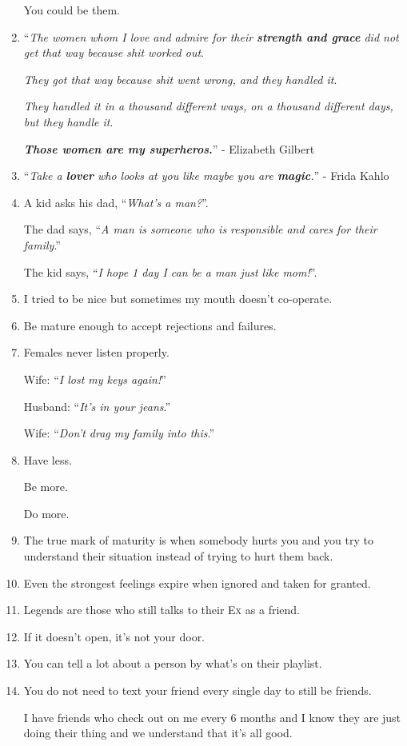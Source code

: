 \documentclass{article}
\begin{document}
\begin{enumerate}
	You could be them.
	\item ``\textit{The women whom I love and admire for their \textbf{strength and grace} did not get that way because shit worked out}.
	
	\textit{They got that way because shit went wrong, and they handled it}.
	
	\textit{They handled it in a thousand different ways, on a thousand different days, but they handle it}.
	
	\textbf{\textit{Those women are my superheros}.}'' - Elizabeth Gilbert
	\item ``\textit{Take a \textbf{lover} who looks at you like maybe you are \textbf{magic}.}'' - Frida Kahlo
	\item A kid asks his dad, ``\textit{What's a man?}''.
	
	The dad says, ``\textit{A man is someone who is responsible and cares for their family}.''
	
	The kid says, ``\textit{I hope 1 day I can be a man just like mom!}''.
	\item I tried to be nice but sometimes my mouth doesn't co-operate.
	\item Be mature enough to accept rejections and failures.
	\item Females never listen properly.
	
	Wife: ``\textit{I lost my keys again!}''
	
	Husband: ``\textit{It's in your jeans}.''
	
	Wife: ``\textit{Don't drag my family into this}.''
	\item Have less.
	
	Be more.
	
	Do more.
	\item The true mark of maturity is when somebody hurts you and you try to understand their situation instead of trying to hurt them back.
	\item Even the strongest feelings expire when ignored and taken for granted.
	\item Legends are those who still talks to their \textsc{Ex} as a friend.
	\item If it doesn't open, it's not your door.
	\item You can tell a lot about a person by what's on their playlist.
	\item You do not need to text your friend every single day to still be friends.
	
	I have friends who check out on me every 6 months and I know they are just doing their thing and we understand that it's all good.
	

\end{enumerate}
\end{document}
